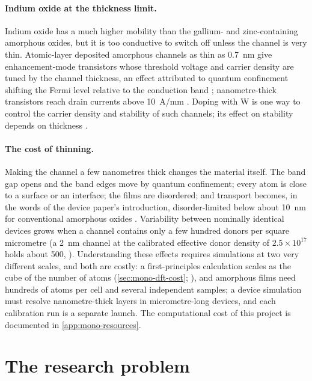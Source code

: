 \paragraph{Indium oxide at the thickness limit.} Indium oxide has a much higher mobility than the gallium- and
zinc-containing amorphous oxides, but it is too conductive to switch off unless the channel is very thin. Atomic-layer
deposited amorphous \InO{} channels as thin as 0.7~nm give enhancement-mode transistors whose threshold voltage and
carrier density are tuned by the channel thickness, an effect attributed to quantum confinement shifting the Fermi level
relative to the conduction band \citep[p.~500]{Si2021}; nanometre-thick \InO{} transistors reach drain currents above
10~A/mm \citep[p.~21536]{Lin2022}. Doping with W is one way to control the carrier density and stability of such
channels; its effect on stability depends on thickness \citep{Kim2024}.

\paragraph{The cost of thinning.} Making the channel a few nanometres thick changes the material itself. The band gap
opens and the band edges move by quantum confinement; every atom is close to a surface or an interface; the films are
disordered; and transport becomes, in the words of the device paper's introduction, disorder-limited below about 10~nm
for conventional amorphous oxides \citep[p.~1]{Januar2026}. Variability between nominally identical devices grows when a
channel contains only a few hundred donors per square micrometre (a 2~nm channel at the calibrated effective donor
density of $2.5\times10^{17}$\cmcu{} holds about 500, ). Understanding these effects requires simulations at
two very different scales, and both are costly: a first-principles calculation scales as the cube of the number of
atoms (\cref{sec:mono-dft-cost}; \citealp{Goedecker1999}), and amorphous films need hundreds of atoms per cell and
several independent samples; a device simulation must resolve nanometre-thick layers in micrometre-long devices, and
each calibration run is a separate launch. The computational cost of this project is documented in
\cref{app:mono-resources}.

\section{The research problem}
\label{sec:mono-intro-problem}

